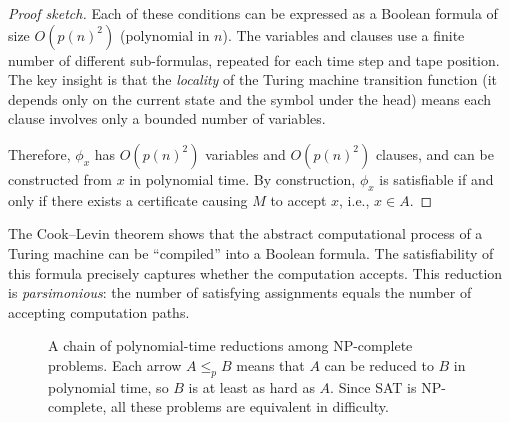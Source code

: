 \begin{proof}[Proof sketch]
Each of these conditions can be expressed as a Boolean formula of size $O(p(n)^2)$ (polynomial in $n$). The variables and clauses use a finite number of different sub-formulas, repeated for each time step and tape position. The key insight is that the \emph{locality} of the Turing machine transition function (it depends only on the current state and the symbol under the head) means each clause involves only a bounded number of variables.

Therefore, $\phi_x$ has $O(p(n)^2)$ variables and $O(p(n)^2)$ clauses, and can be constructed from $x$ in polynomial time. By construction, $\phi_x$ is satisfiable if and only if there exists a certificate causing $M$ to accept $x$, i.e., $x \in A$.
\end{proof}

\begin{remark}
The Cook--Levin theorem shows that the abstract computational process of a Turing machine can be ``compiled'' into a Boolean formula. The satisfiability of this formula precisely captures whether the computation accepts. This reduction is \emph{parsimonious}: the number of satisfying assignments equals the number of accepting computation paths.
\end{remark}

\begin{figure}[htbp]
\centering
{}
\caption{A chain of polynomial-time reductions among NP-complete problems. Each arrow $A \leq_p B$ means that $A$ can be reduced to $B$ in polynomial time, so $B$ is at least as hard as $A$. Since SAT is NP-complete, all these problems are equivalent in difficulty.}
\label{fig:reduction-chain}
\end{figure}


